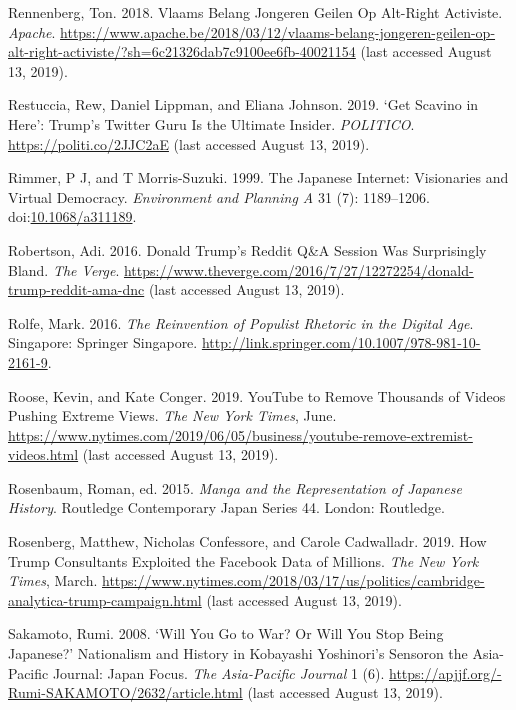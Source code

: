 \documentclass[10pt,british,A4paper,twoside]{memoir}
\begin{document}
\hypertarget{ref-rennenberg_vlaams_2018}{}
Rennenberg, Ton. 2018. Vlaams Belang Jongeren Geilen Op Alt-Right
Activiste. \emph{Apache}.
\url{https://www.apache.be/2018/03/12/vlaams-belang-jongeren-geilen-op-alt-right-activiste/?sh=6c21326dab7c9100ee6fb-40021154} (last accessed August 13, 2019).

\hypertarget{ref-restuccia_get_2019}{}
Restuccia, Rew, Daniel Lippman, and Eliana Johnson. 2019. `Get Scavino
in Here': Trump's Twitter Guru Is the Ultimate Insider. \emph{POLITICO}.
\url{https://politi.co/2JJC2aE} (last accessed August 13, 2019).

\hypertarget{ref-rimmer_japanese_1999}{}
Rimmer, P J, and T Morris-Suzuki. 1999. The Japanese Internet:
Visionaries and Virtual Democracy. \emph{Environment and Planning A} 31
(7): 1189--1206.
doi:\href{https://doi.org/10.1068/a311189}{10.1068/a311189}.

\hypertarget{ref-robertson_donald_2016}{}
Robertson, Adi. 2016. Donald Trump's Reddit Q\&A Session Was
Surprisingly Bland. \emph{The Verge}.
\url{https://www.theverge.com/2016/7/27/12272254/donald-trump-reddit-ama-dnc} (last accessed August 13, 2019).

\hypertarget{ref-rolfe_reinvention_2016}{}
Rolfe, Mark. 2016. \emph{The Reinvention of Populist Rhetoric in the
Digital Age}. Singapore: Springer Singapore.
\url{http://link.springer.com/10.1007/978-981-10-2161-9}.

\hypertarget{ref-roose_youtube_2019}{}
Roose, Kevin, and Kate Conger. 2019. YouTube to Remove Thousands of
Videos Pushing Extreme Views. \emph{The New York Times}, June.
\url{https://www.nytimes.com/2019/06/05/business/youtube-remove-extremist-videos.html} (last accessed August 13, 2019).

\hypertarget{ref-rosenbaum_manga_2015}{}
Rosenbaum, Roman, ed. 2015. \emph{Manga and the Representation of
Japanese History}. Routledge Contemporary Japan Series 44. London:
Routledge.

\hypertarget{ref-rosenberg_how_2019}{}
Rosenberg, Matthew, Nicholas Confessore, and Carole Cadwalladr. 2019.
How Trump Consultants Exploited the Facebook Data of Millions. \emph{The
New York Times}, March.
\url{https://www.nytimes.com/2018/03/17/us/politics/cambridge-analytica-trump-campaign.html} (last accessed August 13, 2019).

\hypertarget{ref-sakamoto_will_2008}{}
Sakamoto, Rumi. 2008. `Will You Go to War? Or Will You Stop Being
Japanese?' Nationalism and History in Kobayashi Yoshinori's Sensoron the
Asia-Pacific Journal: Japan Focus. \emph{The Asia-Pacific Journal} 1
(6). \url{https://apjjf.org/-Rumi-SAKAMOTO/2632/article.html} (last accessed August 13, 2019).
\end{document}

